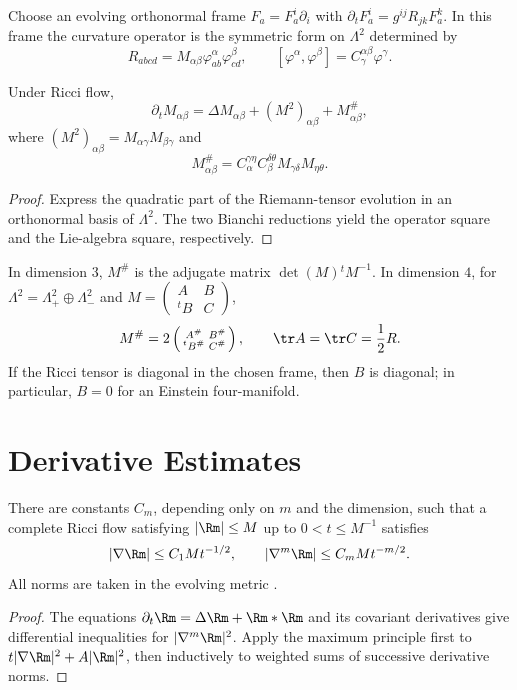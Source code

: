 Choose an evolving orthonormal frame $F_a=F_a^i\partial_i$ with
$\partial_tF_a^i=g^{ij}R_{jk}F_a^k$.  In this frame the curvature
operator is the symmetric form on $\Lambda^2$ determined by
\[
R_{abcd}=M_{\alpha\beta}\varphi_{ab}^\alpha\varphi_{cd}^\beta,
\qquad
[\varphi^\alpha,\varphi^\beta]=C^{\alpha\beta}_\gamma\varphi^\gamma.
\]

\begin{proposition}
  \label{prop:cz-evolution-of-the-curvature-operator}
Under Ricci flow,
\[
\partial_tM_{\alpha\beta}=\Delta M_{\alpha\beta}
+(M^2)_{\alpha\beta}+M^\#_{\alpha\beta},
\]
where $(M^2)_{\alpha\beta}=M_{\alpha\gamma}M_{\beta\gamma}$ and
\[
M^\#_{\alpha\beta}=C_\alpha^{\gamma\eta}C_\beta^{\delta\theta}
M_{\gamma\delta}M_{\eta\theta}.
\]
\cite{Ha86}
\end{proposition}
\begin{proof}
\sketch Express the quadratic part of the Riemann-tensor evolution in
an orthonormal basis of $\Lambda^2$.  The two Bianchi reductions yield
the operator square and the Lie-algebra square, respectively.
\end{proof}

In dimension $3$, $M^\#$ is the adjugate matrix
$\det(M){}^tM^{-1}$.  In dimension $4$, for
$\Lambda^2=\Lambda^2_+\oplus\Lambda^2_-$ and
$M=\left(\begin{smallmatrix}A&B\\{}^tB&C\end{smallmatrix}\right)$,
\[
M^\#=2\left(\begin{smallmatrix}A^\#&B^\#\\{}^tB^\#&C^\#\end{smallmatrix}\right),
\qquad \tr A=\tr C=\frac12R.
\]
If the Ricci tensor is diagonal in the chosen frame, then $B$ is
diagonal; in particular, $B=0$ for an Einstein four-manifold.

\section{Derivative Estimates}

\begin{theorem}
  \label{thm:cz-global-curvature-derivative-estimates}
There are constants $C_m$, depending only on $m$ and the dimension,
such that a complete Ricci flow satisfying $|\Rm|\le M$ up to
$0<t\le M^{-1}$ satisfies
\[
|\nabla\Rm|\le C_1M t^{-1/2},\qquad
|\nabla^m\Rm|\le C_mM t^{-m/2}.
\]
All norms are taken in the evolving metric \cite{Sh89}.
\end{theorem}
\begin{proof}
\sketch The equations $\partial_t\Rm=\Delta\Rm+\Rm*\Rm$ and its
covariant derivatives give differential inequalities for
$|\nabla^m\Rm|^2$.  Apply the maximum principle first to
$t|\nabla\Rm|^2+A|\Rm|^2$, then inductively to weighted sums of
successive derivative norms.
\end{proof}

